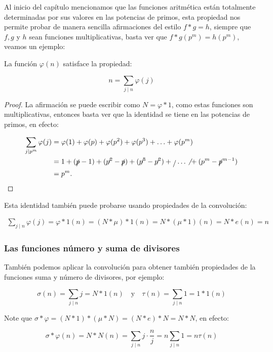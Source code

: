 Al inicio del capítulo mencionamos que las funciones aritmética están totalmente determinadas por sus valores en las potencias de primos, esta propiedad nos permite probar de manera sencilla afirmaciones del estilo $f*g=h$, siempre que $f,g$ y $h$ sean funciones multiplicativas, basta ver que $f*g(p^m)=h(p^m)$, veamos un ejemplo:

\begin{theorem}
La función $\varphi(n)$ satisface la propiedad:

$$n=\sum_{j\mid n}\varphi(j)$$
\end{theorem}

\begin{proof}
La afirmación se puede  escribir como $N=\varphi*1$, como estas funciones son multiplicativas, entonces basta ver que la identidad se tiene en las potencias de primos, en efecto:

\begin{align*}
    \sum_{j\mid p^m}\varphi(j)&=\varphi(1)+\varphi(p)+\varphi(p^2)+\varphi(p^3)+\ldots+\varphi(p^m)\\
    &=1+(\slashed{p}-1)+(\slashed{p^2}-\slashed{p})+(\slashed{p^3}-\slashed{p^2})+\slashed{ } \ldots\not{ } +(p^m-\slashed p^{m-1})\\
    &=p^m
.\end{align*}
\end{proof}

Esta identidad  también puede probarse usando propiedades  de la convolución:

\begin{align*}
    \sum_{j\mid n}\varphi(j)=\varphi*1(n)=(N*\mu)*1(n)=N*(\mu*1)(n)=N*e(n)=n
\end{align*}

\subsubsection{Las funciones número y suma de divisores}

También  podemos aplicar la convolución para obtener también propiedades de la funciones suma y número de divisores, por ejemplo:

\begin{equation}
\sigma(n)=\sum_{j\mid n}j=N*1(n) \quad \text{y} \quad \tau(n)=\sum_{j\mid n}1=1*1(n)
\end{equation}

Note que $\sigma*\varphi=(N*1)*(\mu*N)=(N*e)*N=N*N$, en efecto:

$$\sigma*\varphi(n)=N*N(n)=\sum_{j\mid n}j\cdot\frac{n}{j}=n\sum_{j\mid n}1=n\tau(n)$$

